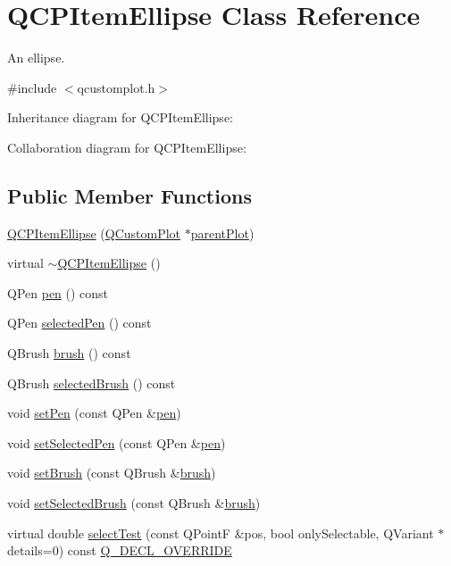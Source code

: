 \hypertarget{class_q_c_p_item_ellipse}{}\section{Q\+C\+P\+Item\+Ellipse Class Reference}
\label{class_q_c_p_item_ellipse}


An ellipse.  




{\ttfamily \#include $<$qcustomplot.\+h$>$}



Inheritance diagram for Q\+C\+P\+Item\+Ellipse\+:


Collaboration diagram for Q\+C\+P\+Item\+Ellipse\+:
\subsection*{Public Member Functions}
\begin{DoxyCompactItemize}
\item 
\hyperlink{class_q_c_p_item_ellipse_a759b77ef002515eba0263b5447ecb3fb}{Q\+C\+P\+Item\+Ellipse} (\hyperlink{class_q_custom_plot}{Q\+Custom\+Plot} $\ast$\hyperlink{class_q_c_p_layerable_a473edb813a4c1929d6b6a8fe3ff3faf7}{parent\+Plot})
\item 
virtual \hyperlink{class_q_c_p_item_ellipse_a3c17073a1805d32b4e09b6ccde0bef76}{$\sim$\+Q\+C\+P\+Item\+Ellipse} ()
\item 
Q\+Pen \hyperlink{class_q_c_p_item_ellipse_a8288f7ce760fc795f5ce4e61136bda19}{pen} () const
\item 
Q\+Pen \hyperlink{class_q_c_p_item_ellipse_a9a200af2797356b45479b601d75437ee}{selected\+Pen} () const
\item 
Q\+Brush \hyperlink{class_q_c_p_item_ellipse_aacf45d032f204d0df3dd0bfdf1172cd3}{brush} () const
\item 
Q\+Brush \hyperlink{class_q_c_p_item_ellipse_afeda9d8e2e6da216a3c3366d87e80feb}{selected\+Brush} () const
\item 
void \hyperlink{class_q_c_p_item_ellipse_adb81a663ed2420fcfa011e49f678d1a6}{set\+Pen} (const Q\+Pen \&\hyperlink{class_q_c_p_item_ellipse_a8288f7ce760fc795f5ce4e61136bda19}{pen})
\item 
void \hyperlink{class_q_c_p_item_ellipse_a6c542fba1dc918041c583f58a50dde99}{set\+Selected\+Pen} (const Q\+Pen \&\hyperlink{class_q_c_p_item_ellipse_a8288f7ce760fc795f5ce4e61136bda19}{pen})
\item 
void \hyperlink{class_q_c_p_item_ellipse_a49fc74e6965834e873d027d026def798}{set\+Brush} (const Q\+Brush \&\hyperlink{class_q_c_p_item_ellipse_aacf45d032f204d0df3dd0bfdf1172cd3}{brush})
\item 
void \hyperlink{class_q_c_p_item_ellipse_a9693501cfaa43a099655c75bed0dab3f}{set\+Selected\+Brush} (const Q\+Brush \&\hyperlink{class_q_c_p_item_ellipse_aacf45d032f204d0df3dd0bfdf1172cd3}{brush})
\item 
virtual double \hyperlink{class_q_c_p_item_ellipse_ab6e2b8a29695c606c7731e498297ca29}{select\+Test} (const Q\+PointF \&pos, bool only\+Selectable, Q\+Variant $\ast$details=0) const \hyperlink{qcustomplot_8h_a42cc5eaeb25b85f8b52d2a4b94c56f55}{Q\+\_\+\+D\+E\+C\+L\+\_\+\+O\+V\+E\+R\+R\+I\+DE}
\end{DoxyCompactItemize}
